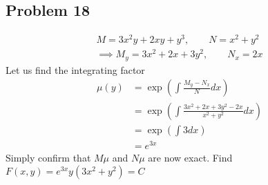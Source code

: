 \documentclass[12pt]{article}
\begin{document}
\subsection*{Problem 18}
\label{sec:org2102992}
\begin{align*}
  M = 3x^2y+2xy+y^3,\quad \quad N = x^2+y^2\\
  \implies M_y = 3x^2+2x+3y^2, \quad \quad N_x = 2x
\end{align*} 
Let us find the integrating factor
\begin{align*}
  \mu(y) &= \exp\left(\int \frac{M_y-N_x}{N} dx\right)\\
         &= \exp\left(\int \frac{3x^2+2x+3y^2-2x}{x^2+y^2} dx\right)\\
         &= \exp\left(\int 3 dx\right)\\
         &= e^{3x}
\end{align*}
Simply confirm that \(M\mu\) and \(N\mu\) are now exact.
Find \(F(x,y) = e^{3x}y(3x^2+y^2) = C\)
\end{document}
